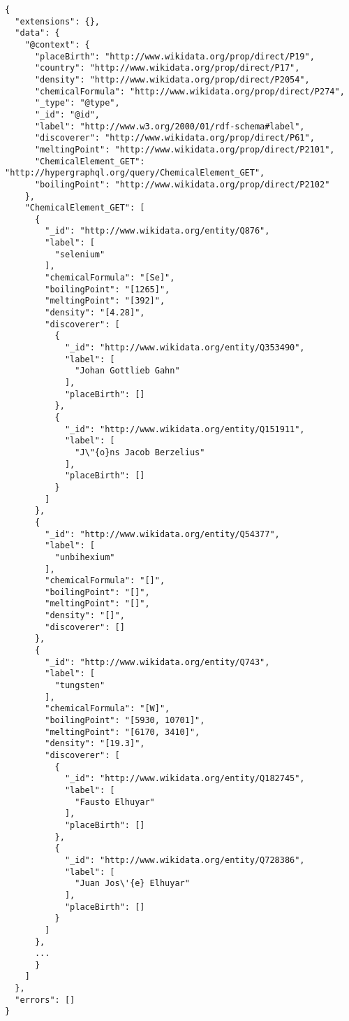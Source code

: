 \begin{minipage}{\linewidth}
\begin{lstlisting}[label=listing:listing33, caption={Output}]
{
  "extensions": {},
  "data": {
    "@context": {
      "placeBirth": "http://www.wikidata.org/prop/direct/P19",
      "country": "http://www.wikidata.org/prop/direct/P17",
      "density": "http://www.wikidata.org/prop/direct/P2054",
      "chemicalFormula": "http://www.wikidata.org/prop/direct/P274",
      "_type": "@type",
      "_id": "@id",
      "label": "http://www.w3.org/2000/01/rdf-schema#label",
      "discoverer": "http://www.wikidata.org/prop/direct/P61",
      "meltingPoint": "http://www.wikidata.org/prop/direct/P2101",
      "ChemicalElement_GET": "http://hypergraphql.org/query/ChemicalElement_GET",
      "boilingPoint": "http://www.wikidata.org/prop/direct/P2102"
    },
    "ChemicalElement_GET": [
      {
        "_id": "http://www.wikidata.org/entity/Q876",
        "label": [
          "selenium"
        ],
        "chemicalFormula": "[Se]",
        "boilingPoint": "[1265]",
        "meltingPoint": "[392]",
        "density": "[4.28]",
        "discoverer": [
          {
            "_id": "http://www.wikidata.org/entity/Q353490",
            "label": [
              "Johan Gottlieb Gahn"
            ],
            "placeBirth": []
          },
          {
            "_id": "http://www.wikidata.org/entity/Q151911",
            "label": [
              "J\"{o}ns Jacob Berzelius"
            ],
            "placeBirth": []
          }
        ]
      },
      {
        "_id": "http://www.wikidata.org/entity/Q54377",
        "label": [
          "unbihexium"
        ],
        "chemicalFormula": "[]",
        "boilingPoint": "[]",
        "meltingPoint": "[]",
        "density": "[]",
        "discoverer": []
      },
      {
        "_id": "http://www.wikidata.org/entity/Q743",
        "label": [
          "tungsten"
        ],
        "chemicalFormula": "[W]",
        "boilingPoint": "[5930, 10701]",
        "meltingPoint": "[6170, 3410]",
        "density": "[19.3]",
        "discoverer": [
          {
            "_id": "http://www.wikidata.org/entity/Q182745",
            "label": [
              "Fausto Elhuyar"
            ],
            "placeBirth": []
          },
          {
            "_id": "http://www.wikidata.org/entity/Q728386",
            "label": [
              "Juan Jos\'{e} Elhuyar"
            ],
            "placeBirth": []
          }
        ]
      },
	  ...
      }
    ]
  },
  "errors": []
}
\end{lstlisting}
\end{minipage}

